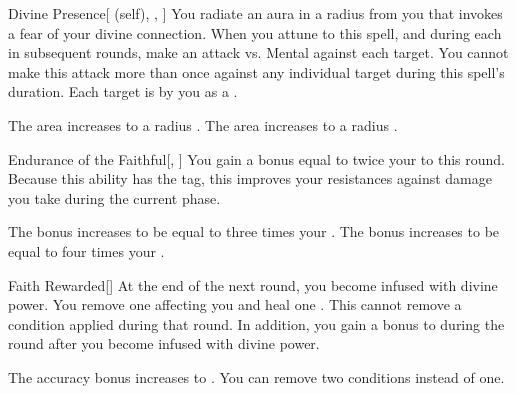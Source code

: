\lowercase{\hypertarget{spell:Divine Presence}{}}\label{spell:Divine Presence}
\begin{attuneability}[Rank 3]{\hypertarget{spell:Divine Presence}{Divine Presence}}[ (self), , ]
You radiate an aura in a \areasmall radius  from you that invokes a fear of your divine connection.
When you attune to this spell, and during each  in subsequent rounds, make an attack vs. Mental against each target.
You cannot make this attack more than once against any individual target during this spell's duration.
\hit Each target is  by you as a .

\rankline
{} The area increases to a \areamed radius .
 The area increases to a \arealarge radius .
\end{attuneability}
\vspace{0.25em}



\lowercase{\hypertarget{spell:Endurance of the Faithful}{}}\label{spell:Endurance of the Faithful}
\begin{freeability}[Rank 3]{\hypertarget{spell:Endurance of the Faithful}{Endurance of the Faithful}}[, ]
You gain a bonus equal to twice your  to  this round.
Because this ability has the  tag, this improves your resistances against damage you take during the current phase.

\rankline
{} The bonus increases to be equal to three times your .
 The bonus increases to be equal to four times your .
\end{freeability}
\vspace{0.25em}



\lowercase{\hypertarget{spell:Faith Rewarded}{}}\label{spell:Faith Rewarded}
\begin{freeability}[Rank 3]{\hypertarget{spell:Faith Rewarded}{Faith Rewarded}}[]
At the end of the next round, you become infused with divine power.
You remove one  affecting you and heal one .
This cannot remove a condition applied during that round.
In addition, you gain a  bonus to  during the round after you become infused with divine power.

\rankline
{} The accuracy bonus increases to .
 You can remove two conditions instead of one.
\end{freeability}
\vspace{0.25em}




